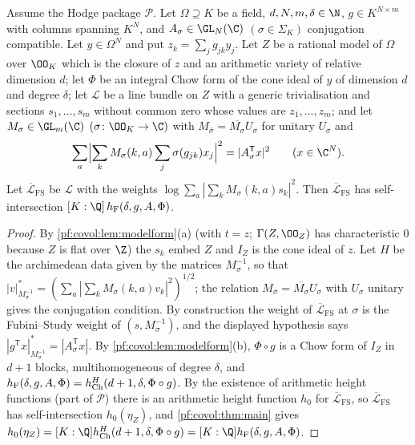 \begin{theorem}\label{pf:covol:thm:chowformheight}
Assume the Hodge package $\mathcal P$. Let $\Omega\supseteq K$ be a field,
$d,N,m,\delta\in\N$, $g\in K^{N\times m}$ with columns spanning $K^N$, and $A_\sigma\in\GL_N(\C)$
$(\sigma\in\Sigma_K)$ conjugation compatible. Let $y\in\Omega^N$ and put $z_k=\sum_jg_{jk}y_j$. Let $Z$ be
a rational model of $\Omega$ over $\OO_K$ which is the closure of $z$ and an arithmetic variety of
relative dimension $d$; let $\Phi$ be an integral Chow form of the cone ideal of $y$ of dimension $d$ and
degree $\delta$; let $\mathcal L$ be a line bundle on $Z$ with a generic trivialisation and sections
$s_1,\dots,s_m$ without common zero whose values are $z_1,\dots,z_m$; and let $M_\sigma\in\GL_m(\C)$
$(\sigma\colon\OO_K\to\C)$ with $M_{\bar\sigma}=\overline{M_\sigma}U_\sigma$ for unitary $U_\sigma$ and
\[
\sum_a\Bigl|\sum_kM_\sigma(k,a)\sum_j\sigma(g_{jk})x_j\Bigr|^2=|A_\sigma^{\mathsf T}x|^2\qquad
(x\in\C^N).
\]
Let $\overline{\mathcal L}_{\mathrm{FS}}$ be $\mathcal L$ with the weights $\log\sum_a|\sum_kM_\sigma(k,a)s_k|^2$.
Then $\overline{\mathcal L}_{\mathrm{FS}}$ has self-intersection $[K:\Q]\,\covolHform(\delta,g,A,\Phi)$.
%
%
\end{theorem}

\begin{proof}
By \cref{pf:covol:lem:modelform}(a) (with $t=z$; $\Gamma(Z,\OO_Z)$ has characteristic $0$ because $Z$ is
flat over $\Z$) the $s_k$ embed $Z$ and $I_Z$ is the cone ideal of $z$. Let $H$ be the archimedean data
given by the matrices $M_\sigma^{-1}$, so that $|v|^*_{M_\sigma^{-1}}=(\sum_a|\sum_kM_\sigma(k,a)v_k|^2)^{1/2}$;
the relation $M_{\bar\sigma}=\overline{M_\sigma}U_\sigma$ with $U_\sigma$ unitary gives the conjugation
condition. By construction the weight of $\overline{\mathcal L}_{\mathrm{FS}}$ at $\sigma$ is the
Fubini--Study weight of $(s,M_\sigma^{-1})$, and the displayed hypothesis says
$|g^{\mathsf T}x|^*_{M_\sigma^{-1}}=|A_\sigma^{\mathsf T}x|$. By \cref{pf:covol:lem:modelform}(b),
$\Phi\circ g$ is a Chow form of $I_Z$ in $d+1$ blocks, multihomogeneous of degree $\delta$, and
$h_{\mathrm{F}}(\delta,g,A,\Phi)=h_{\mathrm{Ch}}^H(d+1,\delta,\Phi\circ g)$. By the existence of arithmetic height
functions (part of $\mathcal P$) there is an arithmetic height function $h_0$ for
$\overline{\mathcal L}_{\mathrm{FS}}$, so $\overline{\mathcal L}_{\mathrm{FS}}$ has self-intersection
$h_0(\eta_Z)$, and \cref{pf:covol:thm:main} gives $h_0(\eta_Z)=[K:\Q]\covolHch^H(d+1,\delta,\Phi\circ g)=
[K:\Q]\covolHform(\delta,g,A,\Phi)$.
\end{proof}


